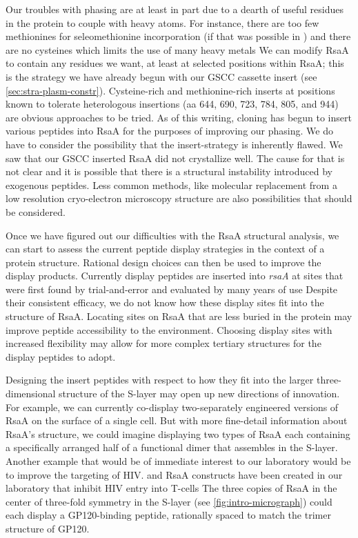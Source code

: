Our troubles with phasing are at least in part due to a dearth of useful
residues in the protein to couple with heavy atoms. For instance, there are too few methionines for seleomethionine incorporation (if that was possible in \caulobacter{}) and there are no cysteines which limits the use of many heavy metals We can modify RsaA to contain any residues we want, at least at selected positions within RsaA; this is the strategy we have already begun with our GSCC cassette insert (see \cref{sec:stra-plasm-constr}). Cysteine-rich and methionine-rich inserts at positions known to tolerate heterologous insertions (\eg \ac{aa} 644, 690, 723, 784, 805, and 944) are obvious approaches to be tried. As of this writing, cloning has begun to insert various peptides into RsaA for the purposes of improving our phasing. We do have to consider the possibility that the insert-strategy is inherently flawed. We saw that our GSCC inserted RsaA did not crystallize well. The cause for that is not clear and it is possible that there is a structural instability introduced by exogenous peptides. Less common methods, like molecular replacement from a low resolution cryo-electron microscopy structure are also possibilities that should be considered. 

Once we have figured out our difficulties with the RsaA structural analysis, we can start to assess the
current peptide display strategies in the context of a protein  structure.
Rational design choices can then be used to improve the display products. Currently display peptides are inserted into \textit{rsaA} at sites that were first found by trial-and-error and evaluated by many years of use Despite their consistent efficacy, we do not know how these display sites fit into the structure of RsaA. Locating sites on RsaA that are less buried in the protein may improve peptide accessibility to the environment. Choosing display sites with increased flexibility may allow for more complex tertiary structures for the display peptides to adopt. 

Designing the insert peptides with respect to how they fit into the larger
three-dimensional structure of the \ac{S-layer} may open up new directions of
innovation. For example, we can currently co-display two-separately engineered
versions of RsaA on the surface of a single \caulobacter cell. But with more
fine-detail information about RsaA's structure, we could imagine displaying two
types of RsaA each containing  a specifically arranged half of a functional
dimer that assembles in the \ac{S-layer}. Another example that would be of
immediate interest to our laboratory would be to improve the targeting of HIV.
\caulobacter and RsaA constructs have been created in our laboratory that
inhibit HIV entry into T-cells The three copies of RsaA in the center of three-fold symmetry in the \ac{S-layer} (see \cref{fig:intro-micrograph}) could each display a GP120-binding peptide, rationally spaced to match the trimer structure of GP120.

